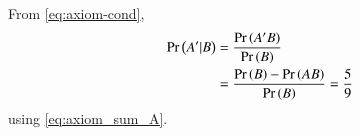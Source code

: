 From \eqref{eq:axiom-cond},
\begin{align}
	\Pr\left(A^{\prime}|B\right) &= 
	\frac{\Pr\left(A^\prime B\right)}{\Pr\left(B\right)}  
	\\
	&=\frac{\Pr\left(B\right) - \Pr\left(AB\right)}{\Pr\left(B\right)} = \frac{5}{9} 
\end{align}
using 
\eqref{eq:axiom_sum_A}.
